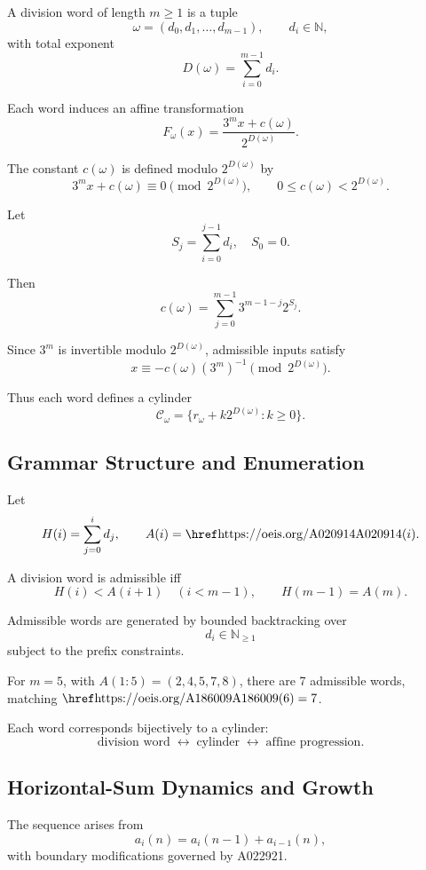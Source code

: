 \documentclass[12pt, oneside]{article}
\numberwithin{equation}{section}
\theoremstyle{definition}
\theoremstyle{plain}
\theoremstyle{remark}
\begin{document}
A division word of length $m \ge 1$ is a tuple
\[
\omega = (d_0, d_1, \dots, d_{m-1}), \qquad d_i \in \mathbb{N},
\]
with total exponent
\[
D(\omega) = \sum_{i=0}^{m-1} d_i.
\]

Each word induces an affine transformation
\[
F_\omega(x) = \frac{3^m x + c(\omega)}{2^{D(\omega)}}.
\]

The constant $c(\omega)$ is defined modulo $2^{D(\omega)}$ by
\[
3^m x + c(\omega) \equiv 0 \pmod{2^{D(\omega)}},
\qquad 0 \le c(\omega) < 2^{D(\omega)}.
\]

Let
\[
S_j = \sum_{i=0}^{j-1} d_i, \quad S_0 = 0.
\]

Then
\[
c(\omega)
=
\sum_{j=0}^{m-1}
3^{m-1-j} 2^{S_j}.
\]

Since $3^m$ is invertible modulo $2^{D(\omega)}$, admissible inputs satisfy
\[
x \equiv -c(\omega)(3^m)^{-1} \pmod{2^{D(\omega)}}.
\]

Thus each word defines a cylinder
\[
\mathcal{C}_\omega = \{ r_\omega + k2^{D(\omega)} : k \ge 0 \}.
\]

\subsection{Grammar Structure and Enumeration}
\label{app:spine-grammar}

Let
\[
H(i) = \sum_{j=0}^i d_j,
\qquad A(i) = \text{\OEIS{A020914}}(i).
\]

A division word is admissible iff
\[
H(i) < A(i+1) \quad (i < m-1),
\qquad
H(m-1) = A(m).
\]

Admissible words are generated by bounded backtracking over
\[
d_i \in \mathbb{N}_{\ge 1}
\]
subject to the prefix constraints.

For $m=5$, with $A(1{:}5) = (2,4,5,7,8)$, there are 7 admissible words,
matching $\text{\OEIS{A186009}}(6)=7$.

Each word corresponds bijectively to a cylinder:
\[
\text{division word} \;\leftrightarrow\; \text{cylinder} \;\leftrightarrow\; \text{affine progression}.
\]

\subsection{Horizontal-Sum Dynamics and Growth}
\label{app:spine-growth}

The sequence  arises from
\[
a_i(n) = a_i(n-1) + a_{i-1}(n),
\]
with boundary modifications governed by A022921.
\end{document}

